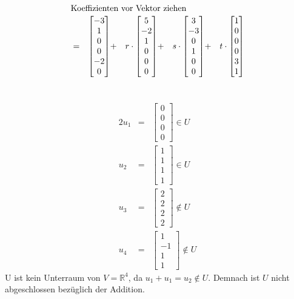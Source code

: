 \documentclass[10pt,a4paper,oneside,ngerman,numbers=noenddot]{scrartcl}
\begin{document}
\begin{alignat*}{5}
\intertext{Koeffizienten vor Vektor ziehen}
&=& 
\begin{bmatrix}
-3 \\
1 \\
0 \\
0 \\
-2 \\
0
\end{bmatrix} &+& r \cdot
\begin{bmatrix}
5 \\
-2 \\
1 \\
0 \\
0 \\
0
\end{bmatrix} &+& s \cdot 
\begin{bmatrix}
3 \\
-3 \\
0 \\
1 \\
0 \\
0
\end{bmatrix} &+& t \cdot 
\begin{bmatrix}
1 \\
0 \\
0 \\
0 \\
3 \\
1
\end{bmatrix}
\end{alignat*}
\section{} %
\subsection{} %
\begin{alignat*}{2}
u_{1} &=& \begin{bmatrix}
0 \\
0 \\
0 \\
0
\end{bmatrix} \in U \\
u_{2} &=& \begin{bmatrix}
1 \\
1 \\
1 \\
1
\end{bmatrix} \in U \\
u_{3} &=& \begin{bmatrix}
2 \\
2 \\
2 \\
2
\end{bmatrix} \not\in U \\
u_{4} &=& \begin{bmatrix}
1 \\
-1 \\
1 \\
1
\end{bmatrix} \not\in U
\end{alignat*}
U ist kein Unterraum von $V = \mathbb{R}^{4}$, da $u_{1} + u_{1} = u_{2} \not\in U$. Demnach ist $U$ nicht abgeschlossen bezüglich der Addition.
\end{document}

